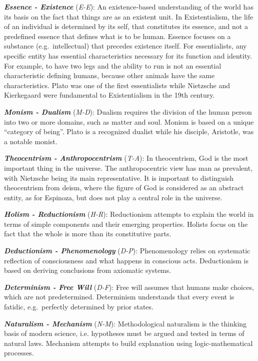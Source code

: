 \documentclass[
 aip,
 jmp,
 amsmath,amssymb,
 reprint,
]{revtex4-1}
\begin{document}
{\bf \em{ Essence - Existence}} (\emph{E-E}): An existence-based
understanding of the world has its basis on the fact that things are
as an existent unit. In Existentialism, the life of an individual is
determined by its self, that constitutes its essence, and not a
predefined essence that defines what is to be human. Essence focuses
on a substance (e.g.\ intellectual) that precedes existence
itself. For essentialists, any specific entity has essential
characteristics necessary for its function and identity. For example,
to have two legs and the ability to run is not an essential
characteristic defining humans, because other animals have the same
characteristics. Plato was one of the first essentialists while
Nietzsche and Kierkegaard were fundamental to Existentialism in the
19th century.

{\bf \em{ Monism - Dualism}} (\emph{M-D}): Dualism requires the
division of the human person into two or more domains, such as matter
and soul. Monism is based on a unique ``category of being''. Plato is
a recognized dualist while his disciple, Aristotle, was a notable
monist.

{\bf \em{ Theocentrism - Anthropocentrism}} (\emph{T-A}): In
theocentrism, God is the most important thing in the universe. The
anthropocentric view has man as prevalent, with Nietzsche being its
main representative. It is important to distinguish theocentrism from
deism, where the figure of God is considered as an abstract entity, as
for Espinoza, but does not play a central role in the universe.

{\bf \em{ Holism - Reductionism}} (\emph{H-R}): Reductionism attempts
to explain the world in terms of simple components and their emerging
properties. Holists focus on the fact that the whole is more than its
constitutive parts.

{\bf \em{ Deductionism - Phenomenology}} (\emph{D-P}): Phenomenology
relies on systematic reflection of consciousness and what happens in
conscious acts. Deductionism is based on deriving conclusions from
axiomatic systems.

{\bf \em{ Determinism - Free Will}} (\emph{D-F}): Free will assumes
that humans make choices, which are not predetermined. Determinism
understands that every event is fatidic, e.g.\, perfectly determined
by prior states.

{\bf \em{ Naturalism - Mechanism}} (\emph{N-M}): Methodological
naturalism is the thinking basis of modern science, i.e. hypotheses
must be argued and tested in terms of natural laws. Mechanism attempts
to build explanation using logic-mathematical processes.
\end{document}

